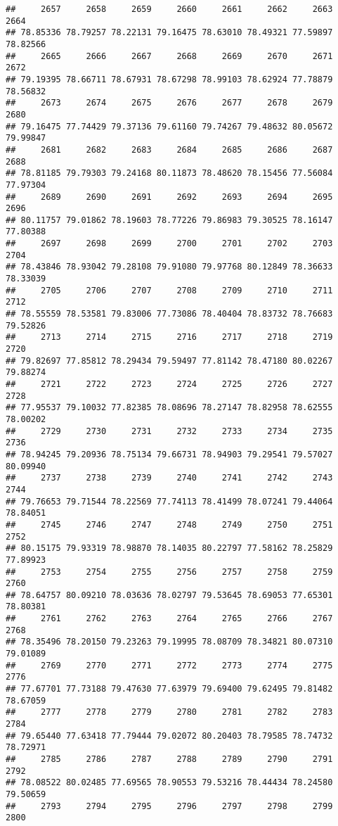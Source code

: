 \documentclass[
]{article}
\begin{document}
\begin{verbatim}
##     2657     2658     2659     2660     2661     2662     2663     2664 
## 78.85336 78.79257 78.22131 79.16475 78.63010 78.49321 77.59897 78.82566 
##     2665     2666     2667     2668     2669     2670     2671     2672 
## 79.19395 78.66711 78.67931 78.67298 78.99103 78.62924 77.78879 78.56832 
##     2673     2674     2675     2676     2677     2678     2679     2680 
## 79.16475 77.74429 79.37136 79.61160 79.74267 79.48632 80.05672 79.99847 
##     2681     2682     2683     2684     2685     2686     2687     2688 
## 78.81185 79.79303 79.24168 80.11873 78.48620 78.15456 77.56084 77.97304 
##     2689     2690     2691     2692     2693     2694     2695     2696 
## 80.11757 79.01862 78.19603 78.77226 79.86983 79.30525 78.16147 77.80388 
##     2697     2698     2699     2700     2701     2702     2703     2704 
## 78.43846 78.93042 79.28108 79.91080 79.97768 80.12849 78.36633 78.33039 
##     2705     2706     2707     2708     2709     2710     2711     2712 
## 78.55559 78.53581 79.83006 77.73086 78.40404 78.83732 78.76683 79.52826 
##     2713     2714     2715     2716     2717     2718     2719     2720 
## 79.82697 77.85812 78.29434 79.59497 77.81142 78.47180 80.02267 79.88274 
##     2721     2722     2723     2724     2725     2726     2727     2728 
## 77.95537 79.10032 77.82385 78.08696 78.27147 78.82958 78.62555 78.00202 
##     2729     2730     2731     2732     2733     2734     2735     2736 
## 78.94245 79.20936 78.75134 79.66731 78.94903 79.29541 79.57027 80.09940 
##     2737     2738     2739     2740     2741     2742     2743     2744 
## 79.76653 79.71544 78.22569 77.74113 78.41499 78.07241 79.44064 78.84051 
##     2745     2746     2747     2748     2749     2750     2751     2752 
## 80.15175 79.93319 78.98870 78.14035 80.22797 77.58162 78.25829 77.89923 
##     2753     2754     2755     2756     2757     2758     2759     2760 
## 78.64757 80.09210 78.03636 78.02797 79.53645 78.69053 77.65301 78.80381 
##     2761     2762     2763     2764     2765     2766     2767     2768 
## 78.35496 78.20150 79.23263 79.19995 78.08709 78.34821 80.07310 79.01089 
##     2769     2770     2771     2772     2773     2774     2775     2776 
## 77.67701 77.73188 79.47630 77.63979 79.69400 79.62495 79.81482 78.67059 
##     2777     2778     2779     2780     2781     2782     2783     2784 
## 79.65440 77.63418 77.79444 79.02072 80.20403 78.79585 78.74732 78.72971 
##     2785     2786     2787     2788     2789     2790     2791     2792 
## 78.08522 80.02485 77.69565 78.90553 79.53216 78.44434 78.24580 79.50659 
##     2793     2794     2795     2796     2797     2798     2799     2800 

\end{verbatim}
\end{document}
